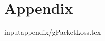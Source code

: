		
	\appendix
	\part*{Appendix} 
	\cleardoublepage\makeatletter\@openrightfalse\makeatother
	
	
  	
	
	
  
  
  input{appendix/gPacketLoss.tex}
		
	\printbibliography
	

	